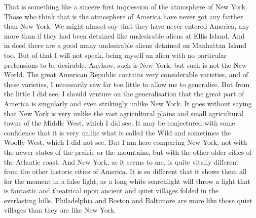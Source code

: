 \documentclass{book}
\begin{document}
That is something like a sincere first impression of the atmosphere of New York. Those who think that is the atmosphere of America have never got any farther than New York. We might almost say that they have never entered America, any more than if they had been detained like undesirable aliens at Ellis Island. And in deed there are a good many undesirable aliens detained on Manhattan Island too. But of that I will not speak, being myself an alien with no particular pretensions to be desirable. Anyhow, such is New York; but such is not the New World. The great American Republic contains very considerable varieties, and of these varieties, I necessarily saw far too little to allow me to generalise. But from the little I did see, I should venture on the generalisation that the great part of America is singularly and even strikingly unlike New York. It goes without saying that New York is very unlike the vast agricultural plains and small agricultural towns of the Middle West, which I did see. It may be conjectured with some confidence that it is very unlike what is called the Wild and sometimes the Woolly West, which I did not see. But I am here comparing New York, not with the newer states of the prairie or the mountains, but with the other older cities of the Atlantic coast. And New York, as it seems to me, is quite vitally different from the other historic cities of America. It is so different that it shows them all for the moment in a false light, as a long white searchlight will throw a light that is fantastic and theatrical upon ancient and quiet villages folded in the everlasting hills. Philadelphia and Boston and Baltimore are more like those quiet villages than they are like New York.
\end{document}
